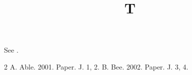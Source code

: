 \documentclass[sigconf]{acmart}
\begin{document}
\title{T}
\maketitle
See \cite{b,a}.
\begin{thebibliography}{2}
 A. Able. 2001. Paper. J. 1, 2.
 B. Bee. 2002. Paper. J. 3, 4.
\end{thebibliography}
\end{document}
